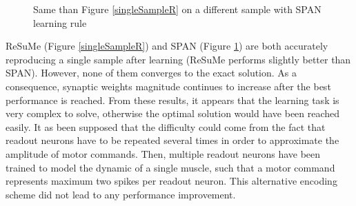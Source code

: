 \documentclass[11pt, a4paper]{article} %
\begin{document}
\begin{figure}
\center
{}
\caption{Same than Figure \ref{singleSampleR} on a different sample with SPAN learning rule}
\label{singleSampleS}
\end{figure}

ReSuMe (Figure \ref{singleSampleR}) and SPAN (Figure \ref{singleSampleS}) are both accurately reproducing a single sample after learning (ReSuMe performs slightly better than SPAN). However, none of them converges to the exact solution. As a consequence, synaptic weights magnitude continues to increase after the best performance is reached. From these results, it appears that the learning task is very complex to solve, otherwise the optimal solution would have been reached easily. It as been supposed that the difficulty could come from the fact that readout neurons have to be repeated several times in order to approximate the amplitude of motor commands. Then, multiple readout neurons have been trained to model the dynamic of a single muscle, such that a motor command represents maximum two spikes per readout neuron. This alternative encoding scheme did not lead to any performance improvement.
\end{document}
